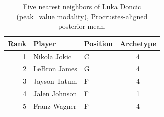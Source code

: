 \begin{table}[htbp]
  \centering\small
  \begin{tabular}{rllc}
    \toprule
    Rank & Player & Position & Archetype \\
    \midrule
    1 & Nikola Jokic & C & 4 \\
    2 & LeBron James & G & 4 \\
    3 & Jayson Tatum & F & 4 \\
    4 & Jalen Johnson & F & 1 \\
    5 & Franz Wagner & F & 4 \\
    \bottomrule
  \end{tabular}
  \caption{Five nearest neighbors of Luka Doncic (peak_value modality), Procrustes-aligned posterior mean.}
  \label{tab:Luka_Doncic_neighbors_peak_value}
\end{table}

